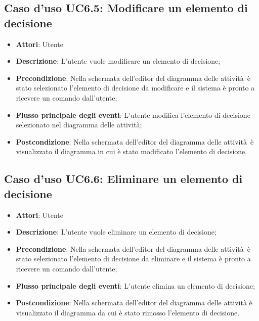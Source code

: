 \documentclass[../AnalisiDeiRequisiti.tex]{subfiles}
\begin{document}
				\subsection{Caso d'uso UC6.5: Modificare un elemento di decisione}
				\begin{itemize}
					\item \textbf{Attori}: Utente
					\item \textbf{Descrizione}: L'utente vuole modificare un elemento di decisione;
					\item \textbf{Precondizione}: Nella schermata dell'editor del diagramma delle attività è stato selezionato l'elemento di decisione da modificare e il sistema è pronto a ricevere un comando dall'utente;
					\item \textbf{Flusso principale degli eventi}: L'utente modifica l'elemento di decisione selezionato nel diagramma delle attività;
					\item \textbf{Postcondizione}: Nella schermata dell'editor del diagramma delle attività è visualizzato il diagramma in cui è stato modificato l'elemento di decisione.
				\end{itemize}
				\subsection{Caso d'uso UC6.6: Eliminare un elemento di decisione}
				\begin{itemize}
					\item \textbf{Attori}: Utente
					\item \textbf{Descrizione}: L'utente vuole eliminare un elemento di decisione;
					\item \textbf{Precondizione}: Nella schermata dell'editor del diagramma delle attività è stato selezionato l'elemento di decisione da eliminare e il sistema è pronto a ricevere un comando dall'utente;
					\item \textbf{Flusso principale degli eventi}: L'utente elimina un elemento di decisione;
					\item \textbf{Postcondizione}: Nella schermata dell'editor del diagramma delle attività è visualizzato il diagramma da cui è stato rimosso l'elemento di decisione.
				\end{itemize}
\end{document}
